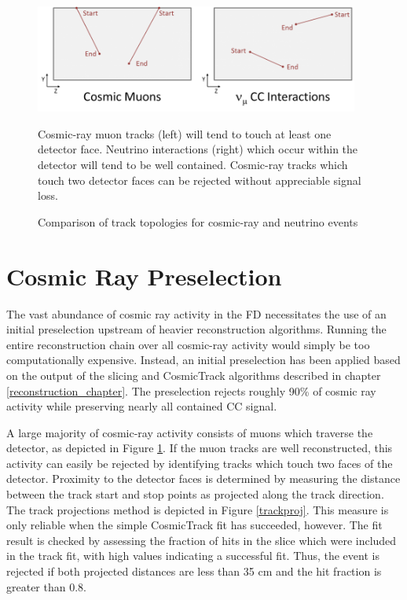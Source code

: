 \begin{figure}
\begin{center}
\includegraphics[width=0.95\textwidth]{figures/selection/cosmicmuons.png}
\end{center}
\caption{Comparison of track topologies for cosmic-ray and neutrino events}{
Cosmic-ray muon tracks (left) will tend to touch at least one detector face.
Neutrino interactions (right) which occur within the detector will tend to
be well contained.
Cosmic-ray tracks which touch two detector faces can be rejected without
appreciable signal loss.
}

\label{cosmictracks}
\end{figure}



\section{Cosmic Ray Preselection}
\label{cosmicveto_section}

The vast abundance of cosmic ray activity in the FD necessitates the
use of an initial preselection upstream of heavier reconstruction
algorithms.
Running the entire reconstruction chain over all cosmic-ray activity would
simply be too computationally expensive.
Instead, an initial preselection has been applied based on the output
of the slicing and CosmicTrack algorithms described in chapter
\ref{reconstruction_chapter}.
The preselection rejects roughly 90\% of cosmic ray activity while preserving
nearly all contained \numu CC signal.

A large majority of cosmic-ray activity consists of muons which traverse the
detector, as depicted in Figure \ref{cosmictracks}.
If the muon tracks are well reconstructed, this activity can easily be rejected
by identifying tracks which touch two faces of the detector.
Proximity to the detector faces is determined by measuring the distance
between the track start and stop points as projected along the track
direction.
The track projections method is depicted in Figure \ref{trackproj}.
This measure is only reliable when the simple CosmicTrack fit has succeeded,
however.
The fit result is checked by assessing the fraction of hits in the slice
which were included in the track fit, with high values indicating a
successful fit.
Thus, the event is rejected if both projected distances are less than 35 cm and
the hit fraction is greater than 0.8.



